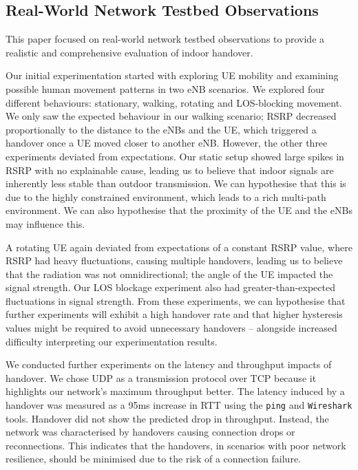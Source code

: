\subsection{Real-World Network Testbed Observations}
This paper focused on real-world network testbed observations to provide a realistic and comprehensive evaluation of indoor handover. 

Our initial experimentation started with exploring UE mobility and examining possible human movement patterns in two eNB scenarios. We explored four different behaviours: stationary, walking, rotating and LOS-blocking movement. We only saw the expected behaviour in our walking scenario; RSRP decreased proportionally to the distance to the eNBs and the UE, which triggered a handover once a UE moved closer to another eNB. However, the other three experiments deviated from expectations. Our static setup showed large spikes in RSRP with no explainable cause, leading us to believe that indoor signals are inherently less stable than outdoor transmission. We can hypothesise that this is due to the highly constrained environment, which leads to a rich multi-path environment. We can also hypothesise that the proximity of the UE and the eNBs may influence this.%

A rotating UE again deviated from expectations of a constant RSRP value, where RSRP had heavy fluctuations, causing multiple handovers, leading us to believe that the radiation was not omnidirectional; the angle of the UE impacted the signal strength. Our LOS blockage experiment also had greater-than-expected fluctuations in signal strength. From these experiments, we can hypothesise that further experiments will exhibit a high handover rate and that higher hysteresis values might be required to avoid unnecessary handovers -- alongside increased difficulty interpreting our experimentation results.

We conducted further experiments on the latency and throughput impacts of handover. We chose UDP as a transmission protocol over TCP because it highlights our network's maximum throughput better. The latency induced by a handover was measured as a 95ms increase in RTT using the \texttt{ping} and \texttt{Wireshark} tools. Handover did not show the predicted drop in throughput. Instead, the network was characterised by handovers causing connection drops or reconnections. This indicates that the handovers, in scenarios with poor network resilience, should be minimised due to the risk of a connection failure.

